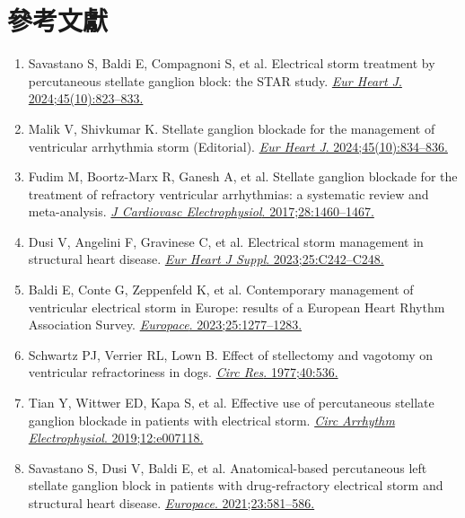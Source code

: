 \documentclass[12pt,a4paper]{article}
\begin{document}
\section{參考文獻}

\begin{enumerate}
    \item Savastano S, Baldi E, Compagnoni S, et al. Electrical storm treatment by percutaneous stellate ganglion block: the STAR study. \href{https://doi.org/10.1093/eurheartj/ehae021}{\textit{Eur Heart J}. 2024;45(10):823--833.}

    \item Malik V, Shivkumar K. Stellate ganglion blockade for the management of ventricular arrhythmia storm (Editorial). \href{https://doi.org/10.1093/eurheartj/ehae083}{\textit{Eur Heart J}. 2024;45(10):834--836.}

    \item Fudim M, Boortz-Marx R, Ganesh A, et al. Stellate ganglion blockade for the treatment of refractory ventricular arrhythmias: a systematic review and meta-analysis. \href{https://doi.org/10.1111/jce.13324}{\textit{J Cardiovasc Electrophysiol}. 2017;28:1460--1467.}

    \item Dusi V, Angelini F, Gravinese C, et al. Electrical storm management in structural heart disease. \href{https://doi.org/10.1093/eurheartjsupp/suad048}{\textit{Eur Heart J Suppl}. 2023;25:C242--C248.}

    \item Baldi E, Conte G, Zeppenfeld K, et al. Contemporary management of ventricular electrical storm in Europe: results of a European Heart Rhythm Association Survey. \href{https://doi.org/10.1093/europace/euac151}{\textit{Europace}. 2023;25:1277--1283.}

    \item Schwartz PJ, Verrier RL, Lown B. Effect of stellectomy and vagotomy on ventricular refractoriness in dogs. \href{https://doi.org/10.1161/01.RES.40.6.536}{\textit{Circ Res}. 1977;40:536.}

    \item Tian Y, Wittwer ED, Kapa S, et al. Effective use of percutaneous stellate ganglion blockade in patients with electrical storm. \href{https://doi.org/10.1161/CIRCEP.118.007118}{\textit{Circ Arrhythm Electrophysiol}. 2019;12:e007118.}

    \item Savastano S, Dusi V, Baldi E, et al. Anatomical-based percutaneous left stellate ganglion block in patients with drug-refractory electrical storm and structural heart disease. \href{https://doi.org/10.1093/europace/euaa319}{\textit{Europace}. 2021;23:581--586.}
\end{enumerate}
\end{document}
